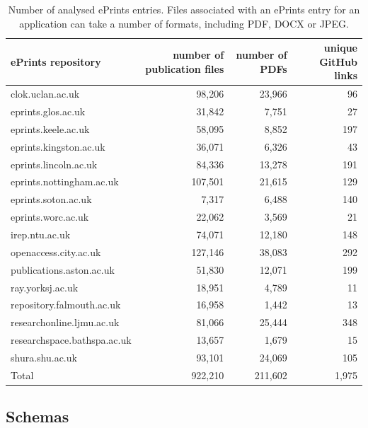 \documentclass[10pt,a4paper]{scrartcl}
\begin{document}
\begin{table}[h]
    \centering
    \begin{tabular}{|l|r|r|r|}
        \hline
        ePrints repository & number of publication files & number of PDFs & unique GitHub links \\
        \hline
        clok.uclan.ac.uk & 98,206 & 23,966 & 96 \\
        eprints.glos.ac.uk & 31,842 & 7,751 & 27 \\
        eprints.keele.ac.uk & 58,095 & 8,852 & 197 \\
        eprints.kingston.ac.uk & 36,071 & 6,326 & 43 \\
        eprints.lincoln.ac.uk & 84,336 & 13,278 & 191 \\
        eprints.nottingham.ac.uk & 107,501 & 21,615 & 129 \\
        eprints.soton.ac.uk & 7,317 & 6,488 & 140 \\
        eprints.worc.ac.uk & 22,062 & 3,569 & 21 \\
        irep.ntu.ac.uk & 74,071 & 12,180 & 148 \\
        openaccess.city.ac.uk & 127,146 & 38,083 & 292 \\
        publications.aston.ac.uk & 51,830 & 12,071 & 199 \\
        ray.yorksj.ac.uk & 18,951 & 4,789 & 11 \\
        repository.falmouth.ac.uk & 16,958 & 1,442 & 13 \\
        researchonline.ljmu.ac.uk & 81,066 & 25,444 & 348 \\
        researchspace.bathspa.ac.uk & 13,657 & 1,679 & 15 \\
        shura.shu.ac.uk & 93,101 & 24,069 & 105 \\
        
        \hline
        Total & 922,210 & 211,602 & 1,975\\
        \hline
    \end{tabular}
    \caption{Number of analysed ePrints entries. Files associated with an ePrints entry for an application can take a number of formats, including PDF, DOCX or JPEG.}
    \label{table:eprints}
\end{table}

\subsection*{Schemas}
\label{section:app_schemas_collection}
\end{document}
